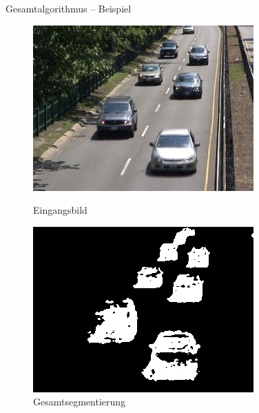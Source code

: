 \documentclass[hyperref={pdfpagelabels=false}]{beamer}
\begin{document}
\begin{frame}[t]{Gesamtalgorithmus -- Beispiel}
	\vspace{1.65em}
	\begin{figure}
		\centering
		\begin{minipage}{0.45\linewidth}
			\includegraphics[width=1\linewidth]{Abbildungen/Eingang3.jpg}
			\caption*{Eingangsbild}
		\end{minipage}
		\begin{minipage}{0.45\linewidth}
			\includegraphics[width=1\linewidth]{Abbildungen/Segmentierung.jpg}
			\caption*{Gesamtsegmentierung}
		\end{minipage}
	\end{figure}
\end{frame}
\end{document}

